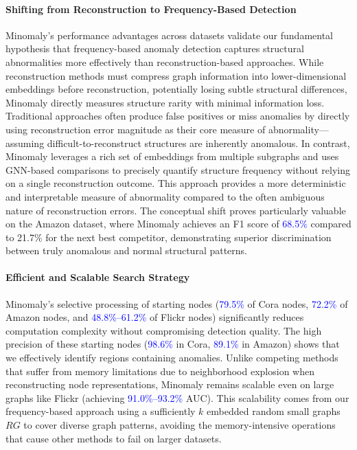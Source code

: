 \documentclass[preprint,12pt]{elsarticle}
\newcommand{\new}[1]{\textcolor{blue}{#1}}
\theoremstyle{plain}
\theoremstyle{definition}
\theoremstyle{remark}
\begin{document}
\paragraph{Shifting from Reconstruction to Frequency-Based Detection}
Minomaly's performance advantages across datasets validate our fundamental hypothesis that frequency-based anomaly detection captures structural abnormalities more effectively than reconstruction-based approaches. While reconstruction methods must compress graph information into lower-dimensional embeddings before reconstruction, potentially losing subtle structural differences, Minomaly directly measures structure rarity with minimal information loss. Traditional approaches often produce false positives or miss anomalies by directly using reconstruction error magnitude as their core measure of abnormality—assuming difficult-to-reconstruct structures are inherently anomalous. In contrast, Minomaly leverages a rich set of embeddings from multiple subgraphs and uses GNN-based comparisons to precisely quantify structure frequency without relying on a single reconstruction outcome. This approach provides a more deterministic and interpretable measure of abnormality compared to the often ambiguous nature of reconstruction errors. The conceptual shift proves particularly valuable on the Amazon dataset, where Minomaly achieves an F1 score of \new{68.5\%} compared to 21.7\% for the next best competitor, demonstrating superior discrimination between truly anomalous and normal structural patterns.

\paragraph{Efficient and Scalable Search Strategy} Minomaly's selective processing of starting nodes (\new{79.5\%} of Cora nodes, \new{72.2\%} of Amazon nodes, and \new{48.8\%--61.2\%} of Flickr nodes) significantly reduces computation complexity without compromising detection quality. The high precision of these starting nodes (\new{98.6\%} in Cora, \new{89.1\%} in Amazon) shows that we effectively identify regions containing anomalies. Unlike competing methods that suffer from memory limitations due to neighborhood explosion when reconstructing node representations, Minomaly remains scalable even on large graphs like Flickr (achieving \new{91.0\%--93.2\%} AUC). This scalability comes from our frequency-based approach using a sufficiently $k$ embedded random small graphs  $RG$ to cover diverse graph patterns, avoiding the memory-intensive operations that cause other methods to fail on larger datasets.
\end{document}
